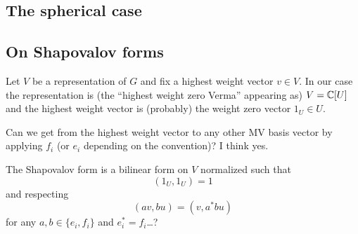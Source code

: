 \begin{example}



\end{example}

\subsection*{The spherical case}

\subsection*{On Shapovalov forms}

Let $V$ be a representation of $G$ and fix a highest weight vector $v\in V$. In our case the representation is (the ``highest weight zero Verma'' appearing as) $V = \mathbb C[U]$ and the highest weight vector is (probably) the weight zero vector $1_U\in U$. 

\begin{question}
    Can we get from the highest weight vector to any other MV basis vector by applying $f_i$ (or $e_i$ depending on the convention)? I think yes. 
\end{question}

The Shapovalov form is a bilinear form on $V$ normalized such that 
\begin{equation}
    (1_U,1_U) = 1
\end{equation}
and respecting 
\begin{equation}
    (a v , b u) = (v,a^*b u) 
\end{equation}
for any $a, b\in \{e_i,f_i\}$ and $e_i^* = f_i$\dots? 

